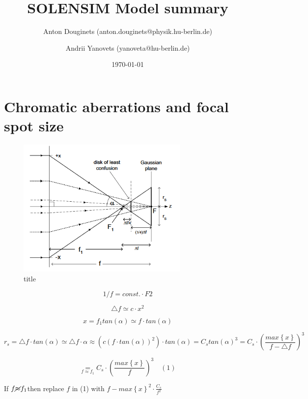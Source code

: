 \documentclass[a4paper,11pt]{article}
\title{SOLENSIM Model summary}
\author{Anton Douginets (anton.douginets@physik.hu-berlin.de)
	\and
	Andrii Yanovets (yanoveta@hu-berlin.de)}
\date{\today}
\begin{document}
\thispagestyle{empty}
\maketitle
\tableofcontents
\begin{abstract}
\end{abstract}
\newpage


\section{Chromatic aberrations and focal spot size}

\begin{figure}
  \centering
  \includegraphics[width=0.75\textwidth]{figures/cs_illustration}
  \caption{title}
\end{figure}

\[
1/f=const.\cdotp F2
\]

\[
\triangle f\simeq c\cdotp x^{2}
\]

\[
x=f_{1}tan\left(\alpha\right)\simeq f\cdotp tan\left(\alpha\right)
\]

\[
r_{s}=\triangle f\cdotp tan\left(\alpha\right)\simeq\triangle f\cdotp\alpha\approx\left(c\left(f\cdotp tan\left(\alpha\right)\right)^{2}\right)\cdotp tan\left(\alpha\right)=C_{s}tan\left(\alpha\right)^{3}=C_{s}\cdotp\left(\frac{max\left\{ x\right\} }{f-\triangle f}\right)^{3}
\]

\[
\underset{f\approx f_{1}}{=}C_{s}\cdotp\left(\frac{max\left\{ x\right\} }{f}\right)^{3}\quad(1)
\]

If $f\cancel{\approx}f_{1}$then replace $f$ in (1) with $f-max\left\{ x\right\} ^{2}\cdotp\frac{C_{s}}{f^{2}}$

\printbibliography


\end{document}
